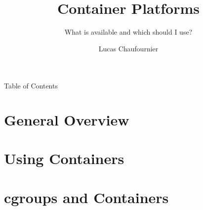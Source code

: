 \documentclass[pdf]{beamer}
\title{Container Platforms}
\subtitle{What is available and which should I use?}
\author{Lucas Chaufournier}
\begin{document}


\begin{frame}
\titlepage
\end{frame}


\begin{frame}{Table of Contents}
	\tableofcontents
\end{frame}


\section{General Overview}












\section{Using Containers}







\section{cgroups and Containers}

\end{document}

